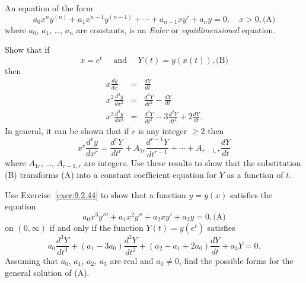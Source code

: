 \documentclass{ximera}
\begin{document}
\begin{problem}\label{exer:9.2.44}
An equation of the form
$$
 a_0x^ny^{(n)}+a_1x^{n-1}y^{(n-1)}+\cdots
+a_{n-1}xy'+a_ny=0,\quad x>0,
\text{(A)}
$$
where $a_0$, $a_1$, \dots, $a_n$ are constants, is an \emph{Euler} or
\emph{equidimensional} equation.

Show that if
$$
 x=e^t \quad \mbox{ and } \quad Y(t)=y(x(t)),
\text{(B)}
$$
then
\begin{eqnarray*}
x \frac{dy}{dx}&=&\frac{dY}{dt}\\
x^2\frac{d^2y}{dx^2}&=&\frac{d^2Y}{dt^2}-\frac{dY}{dt}\\
x^3\frac{d^3y}{dx^3}&=&\frac{d^3Y}{dt^3}-3\frac{d^2Y}{dt^2}+2\frac{dY}{dt}.
\end{eqnarray*}
In general, it can be shown that if $r$ is any integer $\ge2$ then
$$
x^r \frac{d^ry}{dx^r}=\frac{d^rY}{dt^r}+
 A_{1r}\frac{d^{r-1}Y}{dt^{r-1}}+\cdots+A_{r-1,r}
 \frac{dY}{dt}
$$
where $A_{1r}$, \dots, $A_{r-1,r}$ are integers.  Use these results to
show that the substitution (B) transforms (A) into a
constant coefficient equation for $Y$ as a function of $t$.
\end{problem}

\begin{problem}\label{exer:9.2.45}
Use Exercise~\ref{exer:9.2.44}  to show that a function $y=y(x)$ satisfies
the equation
$$
 a_0x^3y'''+a_1x^2y''+a_2xy'+a_3y=0,
\text{(A)}
$$
on $(0,\infty)$
if and only if the function $Y(t)=y(e^t)$ satisfies
$$
a_0\frac{d^3Y}{dt^3}+(a_1-3a_0) \frac{d^2Y}{dt^2}+(a_2-a_1+2a_0)
\frac{dY}{dt}+a_3Y=0.
$$
Assuming that $a_0$, $a_1$, $a_2$, $a_3$ are real and $a_0 \ne0$, find
the possible forms for the general solution of (A).
\end{problem}
\end{document}
